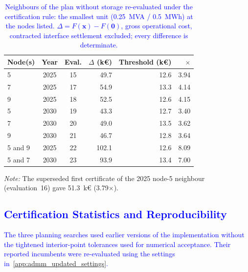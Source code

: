 \documentclass[preprint,12pt]{elsarticle}
\begin{document}
\begin{table}[htbp!]
    \centering
    \caption{\textcolor{blue}{Neighbours of the plan without storage re-evaluated under the certification rule: the smallest unit (0.25~MVA / 0.5~MWh) at the nodes listed. $\Delta = F(\boldsymbol{x}) - F(\boldsymbol{0})$, gross operational cost, contracted interface settlement excluded; every difference is determinate.}}
    \label{tab:appE_neighbours}
    \scriptsize\setlength{\tabcolsep}{5pt}
    \begin{tabular}{l c c r r r}
        \toprule
        Node(s) & Year & Eval. & $\Delta$ (k\euro) & Threshold (k\euro) & $\times$ \\
        \midrule
        5 & 2025 & 15 & 49.7 & 12.6 & 3.94 \\
        7 & 2025 & 17 & 54.9 & 13.3 & 4.14 \\
        9 & 2025 & 18 & 52.5 & 12.6 & 4.15 \\
        5 & 2030 & 19 & 43.3 & 12.7 & 3.40 \\
        7 & 2030 & 20 & 49.0 & 13.5 & 3.62 \\
        9 & 2030 & 21 & 46.7 & 12.8 & 3.64 \\
        5 and 9 & 2025 & 22 & 102.1 & 12.6 & 8.09 \\
        5 and 7 & 2030 & 23 & 93.9 & 13.4 & 7.00 \\
        \bottomrule
    \end{tabular}
    \par\smallskip
    \begin{minipage}{0.80\linewidth}
        \scriptsize\raggedright
        \textit{Note:} The superseded first certificate of the 2025 node-5 neighbour (evaluation~16) gave 51.3~k\euro{} (3.79$\times$).
    \end{minipage}
\end{table}

\subsection{\textcolor{blue}{Certification Statistics and Reproducibility}}
\label{app:results_statistics}

\textcolor{blue}{
    The three planning searches used earlier versions of the implementation without the tightened interior-point tolerances used for numerical acceptance. Their reported incumbents were re-evaluated using the settings in~\ref{app:admm_updated_settings}.
}
\end{document}
